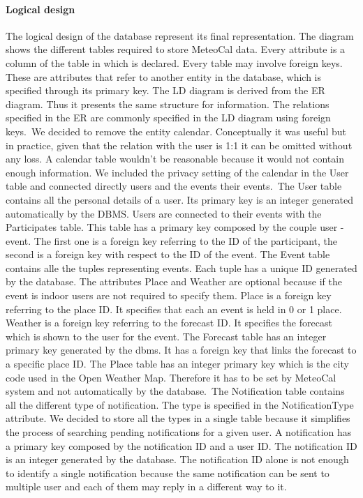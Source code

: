 \documentclass[10pt,a4paper,titlepage]{article}
\begin{document}
\paragraph{Logical design}
The logical design of the database represent its final representation. The diagram shows the different tables required to store MeteoCal data. Every attribute is a column of the table in which is declared. Every table may involve foreign keys. These are attributes that refer to another entity in the database, which is specified through its primary key. 
The LD diagram is derived from the ER diagram. Thus it presents the same structure for information. The relations specified in the ER are commonly specified in the LD diagram using foreign keys.\
We decided to remove the entity calendar. Conceptually it was useful but in practice, given that the relation with the user is 1:1 it can be omitted without any loss. A calendar table wouldn’t be reasonable because it would not contain enough information. We included the privacy setting of the calendar in the User table and connected directly users and the events their events.\
The User table contains all the personal details of a user. Its primary key is an integer generated automatically by the DBMS. 
Users are connected to their events with the Participates table. This table has a primary key composed by the couple user - event. The first one is a foreign key referring to the ID of the participant, the second is a foreign key with respect to the ID of the event.
The Event table contains alle the tuples representing events. Each tuple has a unique ID generated by the database. The attributes Place and Weather are optional because if the event is indoor users are not required to specify them. Place is a foreign key referring to the place ID. It specifies that each an event is held in 0 or 1 place. Weather is a foreign key referring to the forecast ID. It specifies the forecast which is shown to the user for the event.
The Forecast table has an integer primary key generated by the dbms. It has a foreign key that links the forecast to a specific place ID. 
The Place table has an integer primary key which is the city code used in the Open Weather Map. Therefore it has to be set by MeteoCal system and not automatically by the database.\
The Notification table contains all the different type of notification. The type is specified in the NotificationType attribute. We decided to store all the types in a single table because it simplifies the process of searching pending notifications for a given user. A notification has a primary key composed by the notification ID and a user ID. The notification ID is an integer generated by the database. The notification ID alone is not enough to identify a single notification because the same notification can be sent to multiple user and each of them may reply in a different way to it.\
\clearpage
\end{document}
